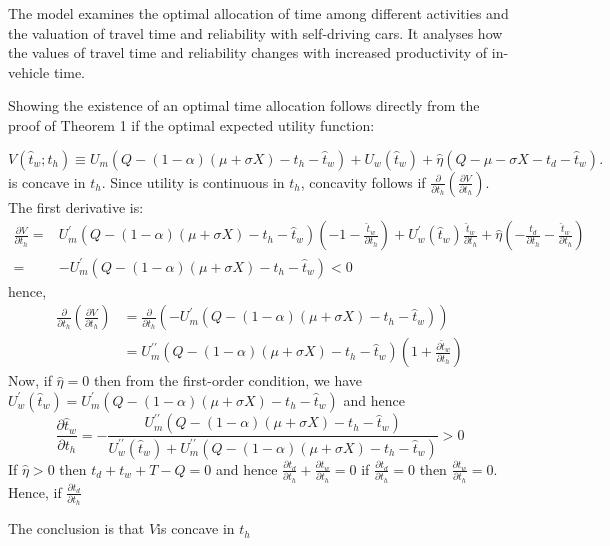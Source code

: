 \documentclass[12pt,a4paper,british]{article}
\begin{document}
The model examines the optimal allocation of time among different activities and the valuation of travel time and reliability with self-driving cars. It analyses how the values of travel time and reliability changes with increased productivity of in-vehicle time.

\clearpage{}


Showing the existence of an optimal time allocation follows directly from the proof of Theorem 1 if the optimal expected utility function:

\begin{equation*}
V\left(\hat{t}_{w};t_{h}\right)\equiv U_{m}\left(Q-\left(1-\alpha\right)\left(\mu+\sigma X\right)-t_{h}-\hat{t}_{w}\right)+U_{w}\left(\hat{t}_{w}\right)+\hat{\eta}\left(Q-\mu-\sigma X-t_{d}-\hat{t}_{w}\right).
\end{equation*}%
is concave in $t_{h}$. Since utility is continuous in $t_{h}$, concavity follows if $\frac{\partial}{\partial t_{h}}\left(\frac{\partial V}{\partial t_{h}}\right)$. The first derivative is:
\begin{align*}
\frac{\partial V}{\partial t_{h}}= & U_{m}^{\prime}\left(Q-\left(1-\alpha\right)\left(\mu+\sigma X\right)-t_{h}-\hat{t}_{w}\right)\left(-1-\frac{\hat{t}_{w}}{\partial t_{h}}\right)+U_{w}^{\prime}\left(\hat{t}_{w}\right)\frac{\hat{t}_{w}}{\partial t_{h}}+\hat{\eta}\left(-\frac{t_{d}}{\partial t_{h}}-\frac{\hat{t}_{w}}{\partial t_{h}}\right)\\
= & -U_{m}^{\prime}\left(Q-\left(1-\alpha\right)\left(\mu+\sigma X\right)-t_{h}-\hat{t}_{w}\right)<0
\end{align*}
hence,
\begin{align*}
\frac{\partial}{\partial t_{h}}\left(\frac{\partial V}{\partial t_{h}}\right) & =\frac{\partial}{\partial t_{h}}\left(-U_{m}^{\prime}\left(Q-\left(1-\alpha\right)\left(\mu+\sigma X\right)-t_{h}-\hat{t}_{w}\right)\right)\\
 & =U_{m}^{\prime\prime}\left(Q-\left(1-\alpha\right)\left(\mu+\sigma X\right)-t_{h}-\hat{t}_{w}\right)\left(1+\frac{\partial\hat{t}_{w}}{\partial t_{h}}\right)
\end{align*}
Now, if $\hat{\eta}=0$ then from the first-order condition, we have $U_{w}^{\prime}\left(\hat{t}_{w}\right)=U_{m}^{\prime}\left(Q-\left(1-\alpha\right)\left(\mu+\sigma X\right)-t_{h}-\hat{t}_{w}\right)$ and hence
\begin{equation*}
\frac{\partial\hat{t}_{w}}{\partial t_{h}}=-\frac{U_{m}^{\prime\prime}\left(Q-\left(1-\alpha\right)\left(\mu+\sigma X\right)-t_{h}-\hat{t}_{w}\right)}{U_{w}^{\prime\prime}\left(\hat{t}_{w}\right)+U_{m}^{\prime\prime}\left(Q-\left(1-\alpha\right)\left(\mu+\sigma X\right)-t_{h}-\hat{t}_{w}\right)}>0
\end{equation*}
If $\hat{\eta}>0$ then $t_{d}+t_{w}+T-Q=0$ and hence $\frac{\partial t_{d}}{\partial t_{h}}+\frac{\partial t_{w}}{\partial t_{h}}=0$ if $\frac{\partial t_{d}}{\partial t_{h}}=0$ then $\frac{\partial t_{w}}{\partial t_{h}}=0$. Hence, if $\frac{\partial t_{d}}{\partial t_{h}}$

The conclusion is that $V$is concave in $t_{h}$

\clearpage{}





\end{document}

